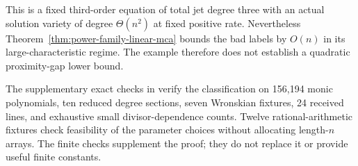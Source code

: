 This is a fixed third-order equation of total jet degree three with an
actual solution variety of degree $\Theta(n^2)$ at fixed positive rate.
Nevertheless Theorem~\ref{thm:power-family-linear-mca} bounds the bad
labels by $O(n)$ in its large-characteristic regime. The example therefore
does not establish a quadratic proximity-gap lower bound.

The supplementary exact checks in 
verify the classification on 156,194 monic polynomials, ten reduced
degree sections, seven Wronskian fixtures, 24 received lines, and
exhaustive small divisor-dependence counts. Twelve rational-arithmetic
fixtures check feasibility of the parameter choices without allocating
length-$n$ arrays. The finite checks supplement the proof; they do not
replace it or provide useful finite constants.
